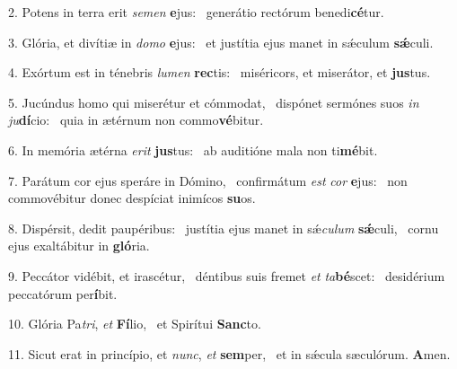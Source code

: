 2. Potens in terra erit \textit{se}\textit{men} \textbf{e}jus: \ast\  generátio rectórum benedi\textbf{cé}tur.\

3. Glória, et divítiæ in \textit{do}\textit{mo} \textbf{e}jus: \ast\  et justítia ejus manet in sǽculum \textbf{sǽ}culi.\

4. Exórtum est in ténebris \textit{lu}\textit{men} \textbf{rec}tis: \ast\  miséricors, et miserátor, et \textbf{jus}tus.\

5. Jucúndus homo qui miserétur et cómmodat, \dag\  dispónet sermónes suos \textit{in} \textit{ju}\textbf{dí}cio: \ast\  quia in ætérnum non commo\textbf{vé}bitur.\

6. In memória ætérna \textit{e}\textit{rit} \textbf{jus}tus: \ast\  ab auditióne mala non ti\textbf{mé}bit.\

7. Parátum cor ejus speráre in Dómino, \dag\  confirmátum \textit{est} \textit{cor} \textbf{e}jus: \ast\  non commovébitur donec despíciat inimícos \textbf{su}os.\

8. Dispérsit, dedit paupéribus: \dag\  justítia ejus manet in sǽ\textit{cu}\textit{lum} \textbf{sǽ}culi, \ast\  cornu ejus exaltábitur in \textbf{gló}ria.\

9. Peccátor vidébit, et irascétur, \dag\  déntibus suis fremet \textit{et} \textit{ta}\textbf{bé}scet: \ast\  desidérium peccatórum per\textbf{í}bit.\

10. Glória Pa\textit{tri}, \textit{et} \textbf{Fí}lio, \ast\  et Spirítui \textbf{Sanc}to.\

11. Sicut erat in princípio, et \textit{nunc}, \textit{et} \textbf{sem}per, \ast\  et in sǽcula sæculórum. \textbf{A}men.\

